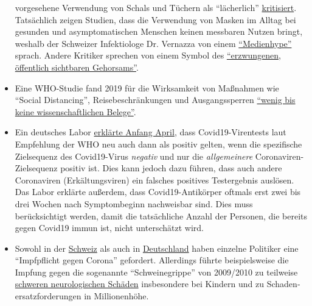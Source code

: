 \begin{itemize}
  vorgesehene Verwendung von Schals und Tüchern als ``lächerlich''
  \href{https://www.aerztezeitung.de/Politik/Montgomery-haelt-Maskenpflicht-fuer-falsch-408844.html}{kritisiert}.
  Tatsächlich zeigen Studien, dass die Verwendung von Masken im Alltag
  bei gesunden und asymptomatischen Menschen keinen messbaren Nutzen
  bringt, weshalb der Schweizer Infektiologe Dr. Vernazza von einem
  \href{https://infekt.ch/2020/04/atemschutzmasken-fuer-alle-medienhype-oder-unverzichtbar/}{``Medienhype''}
  sprach. Andere Kritiker sprechen von einem Symbol des
  \href{https://multipolar-magazin.de/artikel/maskenpflicht-gesellschaftliches-klima}{``erzwungenen,
  öffentlich sichtbaren Gehorsams''}.
\item
  Eine WHO-Studie fand 2019 für die Wirksamkeit von Maßnahmen wie
  ``Social Distancing'', Reisebeschränkungen und Ausgangssperren
  \href{https://www.heise.de/tp/features/COVID-19-WHO-Studie-findet-kaum-Belege-fuer-die-Wirksamkeit-von-Eindaemmungsmassnahmen-4706446.html}{``wenig
  bis keine wissenschaftlichen Belege''}.
\item
  Ein deutsches Labor
  \href{http://www.labor-augsburg-mvz.de/de/aktuelles/coronavirus}{erklärte
  Anfang April}, dass Covid19-Virentests laut Empfehlung der WHO neu
  auch dann als positiv gelten, wenn die spezifische Zielsequenz des
  Covid19-Virus \emph{negativ} und nur die \emph{allgemeinere}
  Coronaviren-Zielsequenz positiv ist. Dies kann jedoch dazu führen,
  dass auch andere Coronaviren (Erkältungsviren) ein falsches positives
  Testergebnis auslösen. Das Labor erklärte außerdem, dass
  Covid19-Antikörper oftmals erst zwei bis drei Wochen nach
  Symptombeginn nachweisbar sind. Dies muss berücksichtigt werden, damit
  die tatsächliche Anzahl der Personen, die bereits gegen Covid19 immun
  ist, nicht unterschätzt wird.
\item
  Sowohl in der
  \href{https://www.20min.ch/schweiz/news/story/-rzte-und-Politiker-fordern-Corona-Impfzwang-20853917}{Schweiz}
  als auch in
  \href{https://www.t-online.de/nachrichten/deutschland/id_87757340/corona-krise-markus-soeder-spricht-sich-fuer-deutschlandweite-impfpflicht-aus.html}{Deutschland}
  haben einzelne Politiker eine ``Impfpflicht gegen Corona'' gefordert.
  Allerdings führte beispielsweise die Impfung gegen die sogenannte
  ``Schweinegrippe'' von 2009/2010 zu teilweise
  \href{https://www.ibtimes.co.uk/brain-damaged-uk-victims-swine-flu-vaccine-get-60-million-compensation-1438572}{schweren
  neurologischen Schäden} insbesondere bei Kindern und zu
  Schaden­­ersatz­forderungen in Millionenhöhe.

\end{itemize}
